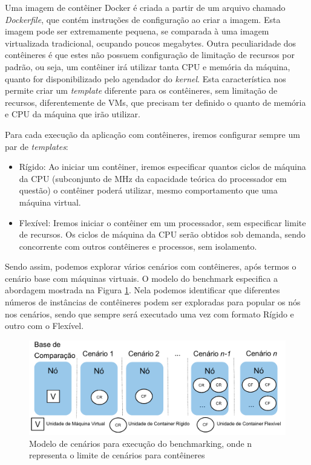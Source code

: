 \documentclass[twoside,english,brazilian]{UNISINOSartigo}
\begin{document}
Uma imagem de contêiner Docker é criada a partir de um arquivo chamado \textit{Dockerfile}, que contém instruções de configuração ao criar a imagem. Esta imagem pode ser extremamente pequena, se comparada à uma imagem virtualizada tradicional, ocupando poucos megabytes. Outra peculiaridade dos contêineres é que estes não possuem configuração de limitação de recursos por padrão, ou seja, um contêiner irá utilizar tanta CPU e memória da máquina, quanto for disponibilizado pelo agendador do \textit{kernel}. Esta característica nos permite criar um \textit{template} diferente para os contêineres, sem limitação de recursos, diferentemente de VMs, que precisam ter definido o quanto de memória e CPU da máquina que irão utilizar. 

Para cada execução da aplicação com contêineres, iremos configurar sempre um par de \textit{templates}:
\begin{itemize}
	\item Rígido: Ao iniciar um contêiner, iremos especificar quantos ciclos de máquina da CPU (subconjunto de MHz da capacidade teórica do processador em questão) o contêiner poderá utilizar, mesmo comportamento que uma máquina virtual.
	\item Flexível: Iremos iniciar o contêiner em um processador, sem especificar limite de recursos. Os ciclos de máquina da CPU serão obtidos sob demanda, sendo concorrente com outros contêineres e processos, sem isolamento.
\end{itemize} 

Sendo assim, podemos explorar vários cenários com contêineres, após termos o cenário base com máquinas virtuais. O modelo do benchmark especifica a abordagem mostrada na Figura \ref{fig:modelo}. Nela podemos identificar que diferentes números de instâncias de contêineres podem ser exploradas para popular os nós nos cenários, sendo que sempre será executado uma vez com formato Rígido e outro com o Flexível.

\begin{figure}[ht!]
	\caption{Modelo de cenários para execução do benchmarking, onde n representa o limite de cenários para contêineres}
	\label{fig:modelo}
	\centering%
	\vspace{-0.75\baselineskip}
	\begin{minipage}{0.7\textwidth}
		\includegraphics[width=\textwidth]{images/cropped_cenarios}
	\end{minipage}
\end{figure}
\end{document}
